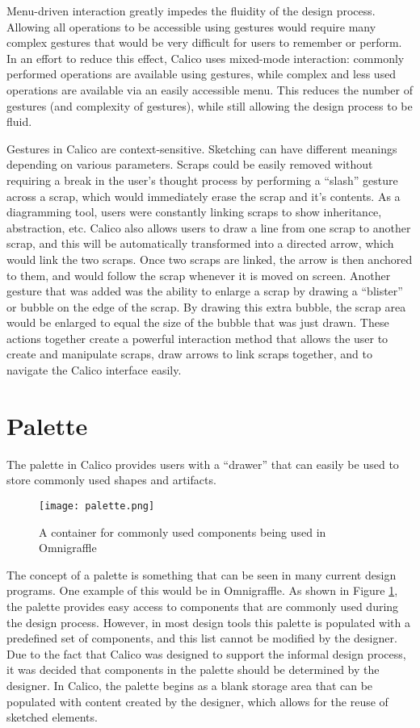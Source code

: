 Menu-driven interaction greatly impedes the fluidity of the design process. Allowing all operations to be accessible using gestures would require many complex gestures that would be very difficult for users to remember or perform. In an effort to reduce this effect, Calico uses mixed-mode interaction: commonly performed operations are available using gestures, while complex and less used operations are available via an easily accessible menu. This reduces the number of gestures (and complexity of gestures), while still allowing the design process to be fluid.

Gestures in Calico are context-sensitive. Sketching can have different meanings depending on various parameters. Scraps could be easily removed without requiring a break in the user's thought process by performing a ``slash'' gesture across a scrap, which would immediately erase the scrap and it's contents.
As a diagramming tool, users were constantly linking scraps to show inheritance, abstraction, etc.
Calico also allows users to draw a line from one scrap to another scrap, and this will be automatically transformed into a directed arrow, which would link the two scraps.
Once two scraps are linked, the arrow is then anchored to them, and would follow the scrap whenever it is moved on screen.
Another gesture that was added was the ability to enlarge a scrap by drawing a ``blister'' or bubble on the edge of the scrap.
By drawing this extra bubble, the scrap area would be enlarged to equal the size of the bubble that was just drawn. These actions together create a powerful interaction method that allows the user to create and manipulate scraps, draw arrows to link scraps together, and to navigate the Calico interface easily. 


\section{Palette}
The palette in Calico provides users with a ``drawer'' that can easily be used to store commonly used shapes and artifacts.
\begin{figure}[htb]
  \centering
  \texttt{[image: palette.png]}
  \caption{A container for commonly used components being used in Omnigraffle}
  \label{fig:palette_omnigraffle}
\end{figure}
The concept of a palette is something that can be seen in many current design programs. One example of this would be in Omnigraffle\cite{omnigraffle}. As shown in Figure \ref{fig:palette_omnigraffle}, the palette provides easy access to components that are commonly used during the design process. However, in most design tools this palette is populated with a predefined set of components, and this list cannot be modified by the designer. Due to the fact that Calico was designed to support the informal design process, it was decided that components in the palette should be determined by the designer. In Calico, the palette begins as a blank storage area that can be populated with content created by the designer, which allows for the reuse of sketched elements. 

